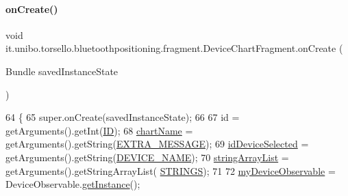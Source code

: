 \paragraph{\texorpdfstring{on\+Create()}{onCreate()}}
{\footnotesize\ttfamily void it.\+unibo.\+torsello.\+bluetoothpositioning.\+fragment.\+Device\+Chart\+Fragment.\+on\+Create (\begin{DoxyParamCaption}\item[{Bundle}]{saved\+Instance\+State }\end{DoxyParamCaption})}


\begin{DoxyCode}
64                                                     \{
65         super.onCreate(savedInstanceState);
66 
67         \textcolor{keywordtype}{id} = getArguments().getInt(\hyperlink{classit_1_1unibo_1_1torsello_1_1bluetoothpositioning_1_1fragment_1_1DeviceChartFragment_a4f077af11a4bef4240a1fe8e2185c20e_a4f077af11a4bef4240a1fe8e2185c20e}{ID});
68         \hyperlink{classit_1_1unibo_1_1torsello_1_1bluetoothpositioning_1_1fragment_1_1DeviceChartFragment_a3ad9d4a2c35dc877d54b82168620c449_a3ad9d4a2c35dc877d54b82168620c449}{chartName} = getArguments().getString(\hyperlink{classit_1_1unibo_1_1torsello_1_1bluetoothpositioning_1_1fragment_1_1DeviceChartFragment_a28ddce9b6c06c183ca8a3717e51d6339_a28ddce9b6c06c183ca8a3717e51d6339}{EXTRA\_MESSAGE});
69         \hyperlink{classit_1_1unibo_1_1torsello_1_1bluetoothpositioning_1_1fragment_1_1DeviceChartFragment_a5140a40f33827bd14ea68efe8157ee06_a5140a40f33827bd14ea68efe8157ee06}{idDeviceSelected} = getArguments().getString(\hyperlink{classit_1_1unibo_1_1torsello_1_1bluetoothpositioning_1_1fragment_1_1DeviceChartFragment_a9313a4d6f386037e62d95d535b379ab2_a9313a4d6f386037e62d95d535b379ab2}{DEVICE\_NAME});
70         \hyperlink{classit_1_1unibo_1_1torsello_1_1bluetoothpositioning_1_1fragment_1_1DeviceChartFragment_a52b2534176114632fe412b609fef559e_a52b2534176114632fe412b609fef559e}{stringArrayList} = getArguments().getStringArrayList(
      \hyperlink{classit_1_1unibo_1_1torsello_1_1bluetoothpositioning_1_1fragment_1_1DeviceChartFragment_a2be86b68a5ce90a3ba90b7a214ac47c0_a2be86b68a5ce90a3ba90b7a214ac47c0}{STRINGS});
71 
72         \hyperlink{classit_1_1unibo_1_1torsello_1_1bluetoothpositioning_1_1fragment_1_1DeviceChartFragment_a82756c59ac344db249e6cebcec3d1835_a82756c59ac344db249e6cebcec3d1835}{myDeviceObservable} = DeviceObservable.\hyperlink{classit_1_1unibo_1_1torsello_1_1bluetoothpositioning_1_1observables_1_1DeviceObservable_ab16792c5848440646624b2a41553954a_ab16792c5848440646624b2a41553954a}{getInstance}();

\end{DoxyCode}
